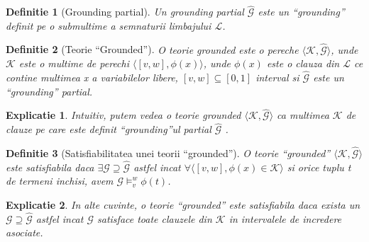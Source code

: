 \documentclass{article}
\newtheorem{definition}{Definitie}[section]
\newtheorem{explanado}{Explicatie}[section]
\begin{document}
\begin{definition}[Grounding partial]
Un grounding partial $\widehat{\mathcal{G}}$ este un ``grounding'' definit pe o submultime a semnaturii limbajului $\mathcal{L}$. \cite{LTN}
\end{definition}

\begin{definition}[Teorie ``Grounded'']
O teorie grounded este o pereche $\langle \mathcal{K},  \widehat{\mathcal{G}} \rangle$, unde $\mathcal{K}	$ este o multime de perechi $\langle [v, w], \phi(x) \rangle$, unde $\phi(x)$ este o clauza din $\mathcal{L}$ ce contine multimea x a variabilelor libere, $[v, w] \subseteq [0, 1]$ interval si $\widehat{\mathcal{G}}$ este un ``grounding'' partial. \cite{LTN}
\end{definition}

\begin{explanado}
Intuitiv, putem vedea o teorie grounded $\langle \mathcal{K},  \widehat{\mathcal{G}} \rangle$ ca multimea $\mathcal{K}$ de clauze pe care este definit ``grounding''ul partial $\widehat{\mathcal{G}}$ . \cite{LTN}
\end{explanado}

\begin{definition}[Satisfiabilitatea unei teorii ``grounded'']
O teorie ``grounded'' $\langle \mathcal{K},  \widehat{\mathcal{G}} \rangle$ este satisfiabila daca
 $\exists \mathcal{G} \supseteq \widehat{\mathcal{G}}$ astfel incat $\forall \langle [v, w], \phi(x) \in \mathcal{K} \rangle$ si orice tuplu t de  termeni inchisi, avem $\mathcal{G} \models_v^w \phi(t)$. \cite{LTN}
\end{definition}

\begin{explanado}
In alte cuvinte, o teorie ``grounded'' este satisfiabila daca exista un $\mathcal{G} \supseteq \widehat{\mathcal{G}}$ astfel incat $\mathcal{G}$ satisface toate clauzele din $\mathcal{K}$ in intervalele de incredere asociate. \cite{LTN}
\end{explanado}
\end{document}
